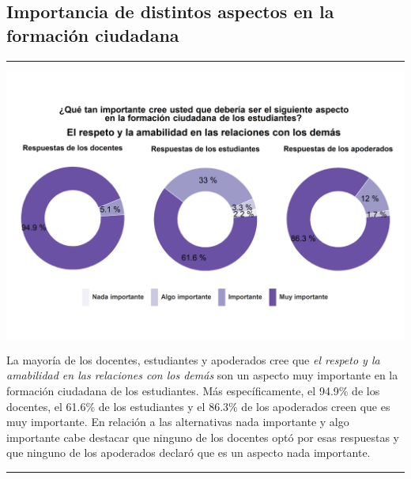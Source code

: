\documentclass[
  14pt,
]{book}
\let\origfigure\figure
\let\endorigfigure\endfigure
\renewenvironment{figure}[1][2] {
  \expandafter\origfigure\expandafter[H]
} {
  \endorigfigure
}
\begin{document}
\hypertarget{importancia-de-distintos-aspectos-en-la-formaciuxf3n-ciudadana}{%
\subsection{Importancia de distintos aspectos en la formación ciudadana}\label{importancia-de-distintos-aspectos-en-la-formaciuxf3n-ciudadana}}

\begin{center}\rule{0.5\linewidth}{0.5pt}\end{center}

\begin{figure}[!ht]

{\centering \includegraphics[width=0.8\linewidth,]{images/graph_for_ciud1} 

}

\caption{Relevancia del respeto en las relaciones con los demás}\label{fig:unnamed-chunk-25}
\end{figure}

La mayoría de los docentes, estudiantes y apoderados cree que \emph{el respeto y la amabilidad en las relaciones con los demás} son un aspecto muy importante en la formación ciudadana de los estudiantes. Más específicamente, el 94.9\% de los docentes, el 61.6\% de los estudiantes y el 86.3\% de los apoderados creen que es muy importante. En relación a las alternativas nada importante y algo importante cabe destacar que ninguno de los docentes optó por esas respuestas y que ninguno de los apoderados declaró que es un aspecto nada importante.

\begin{center}\rule{0.5\linewidth}{0.5pt}\end{center}
\end{document}

